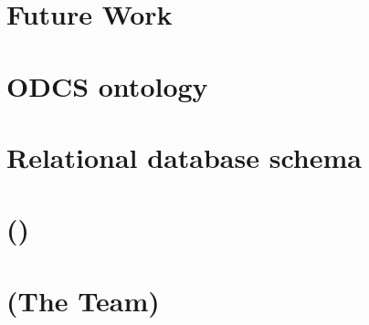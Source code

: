 \chapter{Future Work}




\appendix

\chapter{ODCS ontology}

\chapter{Relational database schema}

\chapter{()}

\chapter{(The Team)}



